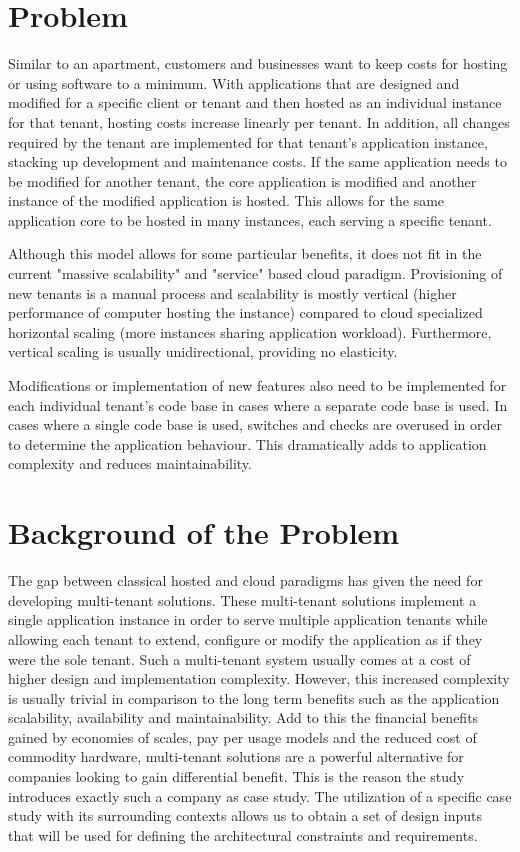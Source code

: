  \section{Problem}
 
Similar to an apartment, customers and businesses want to keep costs for hosting or using software to a minimum. With applications that are designed and modified for a specific client or tenant and then hosted as an individual instance for that tenant, hosting costs increase linearly per tenant. In addition, all changes required by the tenant are implemented for that tenant's application instance, stacking up development and maintenance costs. If the same application needs to be modified for another tenant, the core application is modified and another instance of the modified application is hosted. This allows for the same application core to be hosted in many instances, each serving a specific tenant. 

Although this model allows for some particular benefits, it does not fit in the current "massive scalability" and "service" based cloud paradigm. Provisioning of new tenants is a manual process and scalability is mostly vertical (higher performance of computer hosting the instance) compared to cloud specialized horizontal scaling (more instances sharing application workload). Furthermore, vertical scaling is usually unidirectional, providing no elasticity. 

Modifications or implementation of new features also need to be implemented for each individual tenant's code base in cases where a separate code base is used. In cases where a single code base is used, switches and checks are overused in order to determine the application behaviour. This dramatically adds to application complexity and reduces maintainability.

\section{Background of the Problem}
The gap between classical hosted and cloud paradigms has given the need for developing multi-tenant solutions. These multi-tenant solutions implement a single application instance in order to serve multiple application tenants while allowing each tenant to extend, configure or modify the application as if they were the sole tenant. Such a multi-tenant system usually comes at a cost of higher design and implementation complexity. However, this increased complexity is usually trivial in comparison to the long term benefits such as the application scalability, availability  and maintainability. Add to this the financial benefits gained by economies of scales, pay per usage models and the reduced cost of commodity hardware, multi-tenant solutions are a powerful alternative for companies looking to gain differential benefit. This is the reason the study introduces exactly such a company as case study. The utilization of a specific case study with its surrounding contexts allows us to obtain a set of design inputs that will be used for defining the architectural constraints and requirements. 


